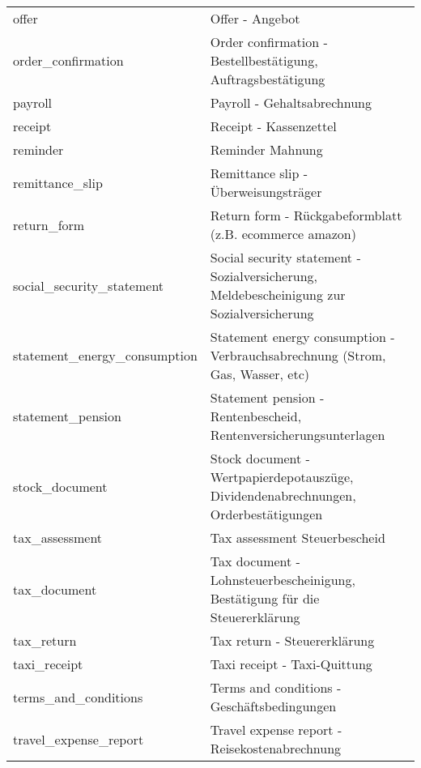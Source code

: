 \begin{longtable}[h]{|l|p{9cm}|}
 offer                                    &  Offer -  Angebot                                                                                  \\
 order\_confirmation                      &  Order confirmation  - Bestellbest\"{a}tigung, Auftragsbest\"{a}tigung                         \\
 payroll                                  &  Payroll -  Gehaltsabrechnung                                                                      \\
 receipt                                  &  Receipt  - Kassenzettel                                                                           \\
 reminder                                 &  Reminder  Mahnung                                                                                 \\
 remittance\_slip                         &  Remittance slip -  \"{U}berweisungstr\"{a}ger                                                 \\
 return\_form                             &  Return form -  R\"{u}ckgabeformblatt (z.B. ecommerce amazon)                                    \\
 social\_security\_statement              &  Social security statement -  Sozialversicherung, Meldebescheinigung zur Sozialversicherung        \\
 statement\_energy\_consumption           &  Statement energy consumption -  Verbrauchsabrechnung (Strom, Gas, Wasser, etc)                    \\
 statement\_pension                       &  Statement pension -  Rentenbescheid, Rentenversicherungsunterlagen                                \\
 stock\_document                          &  Stock document -  Wertpapierdepotausz\"{u}ge, Dividendenabrechnungen, Orderbest\"{a}tigungen  \\
 tax\_assessment                          &  Tax assessment  Steuerbescheid                                                                    \\
 tax\_document                            &  Tax document -  Lohnsteuerbescheinigung, Best\"{a}tigung f\"{u}r die Steuererkl\"{a}rung    \\
 tax\_return                              &  Tax return -  Steuererkl\"{a}rung                                                               \\
 taxi\_receipt                            &  Taxi receipt - Taxi-Quittung                                                                      \\
 terms\_and\_conditions                   &  Terms and conditions -  Gesch\"{a}ftsbedingungen                                                \\
 travel\_expense\_report                  &  Travel expense report - Reisekostenabrechnung     \\             \hline                          
\end{longtable}

